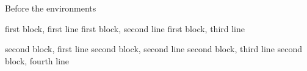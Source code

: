Before the environments
\begin{one}
first block, first line
first block, second line
	first block, third line
	\begin{two}
		second block, first line
second block, second line
		second block, third line
		second block, fourth line
\end{two}
\end{one}
